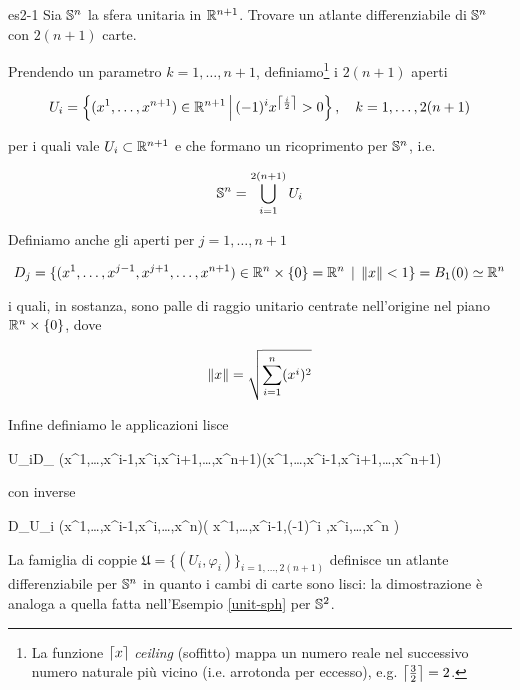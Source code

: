 
{es2-1}
{
Sia $ \S^{n} $ la sfera unitaria in $ \R^{n+1} $. Trovare un atlante differenziabile di $ \S^{n} $ con $ 2(n+1) $ carte.
}
{
Prendendo un parametro $ k = 1,\dots,n+1 $, definiamo\footnote{%
	La funzione $ \ceil*{x} $ \textit{ceiling} (soffitto) mappa un numero reale nel successivo numero naturale più vicino (i.e. arrotonda per eccesso), e.g. $ \ceil*{\frac{3}{2}} = 2 $.%
} i $ 2(n+1) $ aperti

\begin{equation}
	U_{i} = \left\{ (x^{1},\dots,x^{n+1}) \in \R^{n+1} \st (-1)^{i} x^{\ceil*{\frac{i}{2}}} > 0 \right\} \qcomma k = 1, \dots, 2(n+1)
\end{equation}

per i quali vale $ U_{i} \subset \R^{n+1} $ e che formano un ricoprimento per $ \S^{n} $, i.e.

\begin{equation}
	\S^{n} = \bigcup_{i=1}^{2(n+1)} U_{i}
\end{equation}

Definiamo anche gli aperti per $ j = 1,\dots,n+1 $

\begin{equation}
	D_{j} = \{ (x^{1},\dots,x^{j-1},x^{j+1},\dots,x^{n+1}) \in \R^{n} \times \{0\} = \R^{n} \, \mid \, \norm{x} < 1 \} = B_{1}(0) \simeq \R^{n}
\end{equation}

i quali, in sostanza, sono palle di raggio unitario centrate nell'origine nel piano $ \R^{n} \times \{0\} $, dove

\begin{equation}
	\norm{x} = \sqrt{ \sum_{i=1}^{n} (x^{i})^{2} }
\end{equation}

Infine definiamo le applicazioni lisce

	{U_{i}}{D_{}}
	{(x^{1},\dots,x^{i-1},x^{i},x^{i+1},\dots,x^{n+1})}{(x^{1},\dots,x^{i-1},x^{i+1},\dots,x^{n+1})}

con inverse

	{D_{}}{U_{i}}
	{(x^{1},\dots,x^{i-1},x^{i},\dots,x^{n})}{\left( x^{1},\dots,x^{i-1},(-1)^{i} ,x^{i},\dots,x^{n} \right)}

La famiglia di coppie $ \mathfrak{U} = \{ (U_{i},\varphi_{i}) \}_{i=1,\dots,2(n+1)} $ definisce un atlante differenziabile per $ \S^{n} $ in quanto i cambi di carte sono lisci: la dimostrazione è analoga a quella fatta nell'Esempio \ref{unit-sph} per $ \S^{2} $.
}

